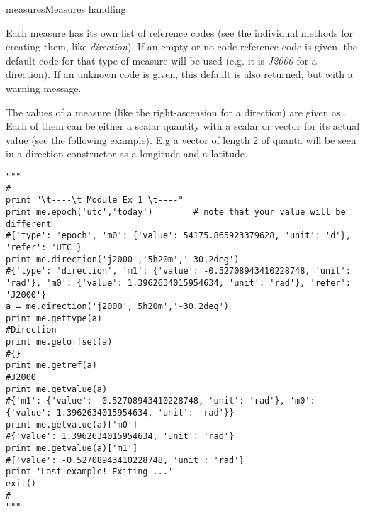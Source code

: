 \begin{ahmodule}{measures}{Measures handling}
\begin{ahdescription}
Each measure has its own list of reference codes (see the individual
methods for creating them, like {\em direction}). If an empty or no
code reference code is given, the default code for that type of
measure will be used (e.g. it is {\em J2000} for a direction). If an
unknown code is given, this default is also returned, but with a
warning message.

The values of a measure (like the right-ascension for a direction) are given
as . Each of them can be either a scalar quantity
with a scalar or vector for its actual value (see the following example).
E.g a vector of
length 2 of quanta will be seen in a direction constructor as a longitude and
a latitude.

\begin{verbatim}
"""  
#  
print "\t----\t Module Ex 1 \t----"
print me.epoch('utc','today')	     # note that your value will be different
#{'type': 'epoch', 'm0': {'value': 54175.865923379628, 'unit': 'd'}, 'refer': 'UTC'}
print me.direction('j2000','5h20m','-30.2deg')
#{'type': 'direction', 'm1': {'value': -0.52708943410228748, 'unit': 'rad'}, 'm0': {'value': 1.3962634015954634, 'unit': 'rad'}, 'refer': 'J2000'}
a = me.direction('j2000','5h20m','-30.2deg')
print me.gettype(a)
#Direction 
print me.getoffset(a)
#{}
print me.getref(a)
#J2000 
print me.getvalue(a)  
#{'m1': {'value': -0.52708943410228748, 'unit': 'rad'}, 'm0': {'value': 1.3962634015954634, 'unit': 'rad'}}
print me.getvalue(a)['m0']
#{'value': 1.3962634015954634, 'unit': 'rad'}
print me.getvalue(a)['m1']
#{'value': -0.52708943410228748, 'unit': 'rad'}
print 'Last example! Exiting ...'
exit()
#
"""
\end{verbatim}


\end{ahdescription}
\end{ahmodule}
